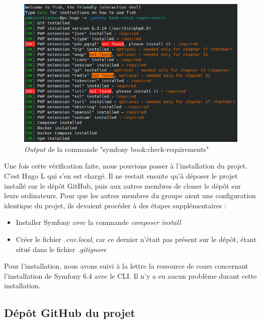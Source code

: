 \documentclass[12pt,a4paper]{article}
\begin{document}
\begin{figure}[!h]
	\begin{center}
		\includegraphics[scale=.6]{../images/book.png}
		\caption{\textit{Output} de la commande "symfony book:check-requirements" }
	\end{center}
\end{figure}	

\newpage
		Une fois cette vérification faite, nous pouvions passer à l'installation du projet. C'est Hugo L qui s'en est chargé. Il ne restait ensuite qu'à déposer le projet installé sur le dépôt GitHub, puis aux autres membres de cloner le dépôt sur leurs ordinateurs. Pour que les autres membres du groupe aient une configuration identique du projet, ils devaient procéder à des étapes supplémentaires : \\
		\begin{itemize}
			\item Installer Symfony avec la commande \textit{composer install}
			\item Créer le fichier \textit{.env.local}, car ce dernier n'était pas présent sur le dépôt, étant situé dans le fichier \textit{.gitignore} \\
		\end{itemize}
		
		Pour l'installation, nous avons suivi à la lettre la ressource de cours concernant l'installation de Symfony 6.4 avec le CLI. Il n'y a eu aucun problème durant cette installation.
		
		\subsection{Dépôt GitHub du projet}
		
\end{document}
